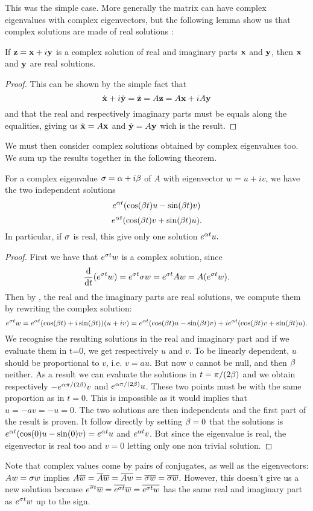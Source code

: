 This was the simple case. More generally the matrix can have complex eigenvalues with complex eigenvectors, but the following lemma show us that complex solutions are made of real solutions :
\begin{lemme} \label{lem:complex}
If $\mathbf{z}=\mathbf{x}+i\mathbf{y}$ is a complex solution of real and imaginary parts $\mathbf{x}$ and $\mathbf{y}$, then $\mathbf{x}$ and $\mathbf{y}$ are real solutions.
\end{lemme}
\begin{proof}
This can be shown by the simple fact that
\[\dot{\mathbf{x}}+i\dot{\mathbf{y}} =\dot{\mathbf{z}} = A\mathbf{z} = A\mathbf{x}+iA\mathbf{y} \]
and that the real and respectively imaginary parts must be equals along the equalities, giving us $\dot{\mathbf{x}}=A\mathbf{x}$ and $\dot{\mathbf{y}}=A\mathbf{y}$ wich is the result.
\end{proof}
We must then consider complex solutions obtained by complex eigenvalues too. We sum up the results together in the following theorem.
\begin{theoreme} \label{th:eigensolutions}
For a complex eigenvalue $\sigma=\alpha+i\beta$ of $A$ with eigenvector $w=u+iv$, we have the two independent solutions
\[e^{\alpha t}(\cos(\beta t)u - \sin(\beta t)v)\] 
\[e^{\alpha t}(\cos(\beta t)v + \sin(\beta t)u).\] 
In particular, if $\sigma$ is real, this give only one solution $e^{\alpha t}u.$ 
\end{theoreme}
\begin{proof}
First we have that $e^{\sigma t}w$ is a complex solution, since 
\[\frac{\mathrm{d}}{\mathrm{d} t}(e^{\sigma t}w) = e^{\sigma t}\sigma w = e^{\sigma t}Aw = A(e^{\sigma t}w).\]
Then by , the real and the imaginary parts are real solutions, we compute them by rewriting the complex solution:
\[e^{\sigma t}w = e^{\alpha t}(\cos(\beta t) + i\sin(\beta t))(u+iv)
= e^{\alpha t}(\cos(\beta t)u - \sin(\beta t)v) + ie^{\alpha t}(\cos(\beta t)v + \sin(\beta t)u).\]
We recognise the resulting solutions in the real and imaginary part and if we evaluate them in t=0, we get respectively $u$ and $v$. To be linearly dependent, $u$ should be proportional to $v$, i.e. $v=au$. But now $v$ cannot be null, and then $\beta$ neither. As a result we can evaluate the solutions in $t=\pi/(2\beta)$ and we obtain respectively $-e^{\alpha\pi/(2\beta)}v$ and $e^{\alpha\pi/(2\beta)}u$. These two points must be with the same proportion as in $t=0$. This is impossible as it would implies that $u=-av=-u=0$. The two solutions are then independents and the first part of the result is proven. It follow directly by setting $\beta=0$ that the solutions is $e^{\alpha t}(\cos(0)u - \sin(0)v) = e^{\alpha t}u$ and  $e^{\alpha t}v$. But since the eigenvalue is real, the eigenvector is real too and $v=0$ letting only one non trivial solution.
\end{proof}
\begin{remarque}
Note that complex values come by pairs of conjugates, as well as the eigenvectors: \\
$Aw=\sigma w$ implies $A\overline{w} = \overline{A}\overline{w} = \overline{Aw}= \overline{\sigma w} = \overline{\sigma}\overline{w}$. However, this doesn't give us a new solution because $e^{\overline{\sigma} t}\overline{w}= \overline{e^{\sigma t}}\overline{w} = \overline{e^{\sigma t}w}$ has the same real and imaginary part as $e^{\sigma t}w$ up to the sign.
\end{remarque}
